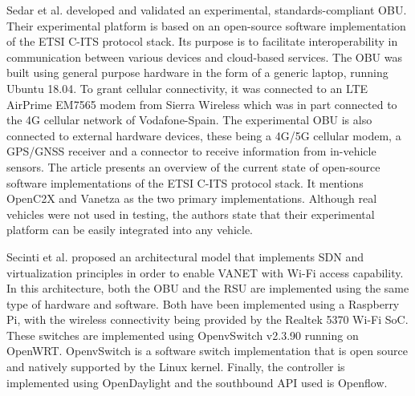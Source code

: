     
    Sedar et al.\cite{sedar_standards-compliant_2021} developed and validated an experimental, standards-compliant OBU. Their experimental platform is based on an open-source software implementation of the ETSI C-ITS protocol stack. Its purpose is to facilitate interoperability in communication between various devices and cloud-based services.
    The OBU was built using general purpose hardware in the form of a generic laptop, running Ubuntu 18.04. To grant cellular connectivity, it was connected to an LTE AirPrime EM7565 modem from Sierra Wireless which was in part connected to the 4G cellular network of Vodafone-Spain. The experimental OBU is also connected to external hardware devices, these being a 4G/5G cellular modem, a GPS/GNSS receiver and a connector to receive information from in-vehicle sensors.
    The article presents an overview of the current state of open-source software implementations of the ETSI C-ITS protocol stack. It mentions OpenC2X and Vanetza as the two primary implementations. 
    Although real vehicles were not used in testing, the authors state that their experimental platform can be easily integrated into any vehicle.
    
    
    Secinti et al.\cite{secinti_software_2017} proposed an architectural model that implements SDN and virtualization principles in order to enable VANET with Wi-Fi access capability. 
    In this architecture, both the OBU and the RSU are implemented using the same type of hardware and software. Both have been implemented using a Raspberry Pi, with the wireless connectivity being provided by the Realtek 5370 Wi-Fi SoC.
    These switches are implemented using OpenvSwitch v2.3.90 running on OpenWRT. OpenvSwitch is a software switch implementation that is open source and natively supported by the Linux kernel\cite{noauthor_open_nodate-2}. Finally, the controller is implemented using OpenDaylight and the southbound API used is Openflow.
    
